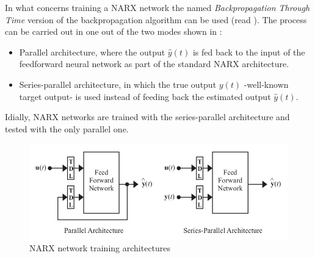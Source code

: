 
In what concerns training a NARX network the
named \emph{Backpropagation Through Time} version of the
backpropagation algorithm can be used (read ). The
process can be carried out in one out of the two modes shown
in  \cite{menezes2008long}:
\begin{itemize}
	\item Parallel architecture, where the output $\hat{y}(t)$ is
	fed back to the input of the feedforward neural network as
	part of the standard NARX architecture.  

        \item Series-parallel architecture, in which the true output
	$y(t)$ -well-known target output- is used instead of feeding
	back the estimated output $\hat{y}(t)$.
\end{itemize}

Idially, NARX networks are trained with the series-parallel architecture and tested with the only parallel one.

\begin{figure}[!ht]
\centering
\includegraphics[width=\textwidth]{images/narxTrainingArchitectures.png}
\caption{NARX network training architectures}
\label{fig:narxtrainingarch}
\end{figure}



